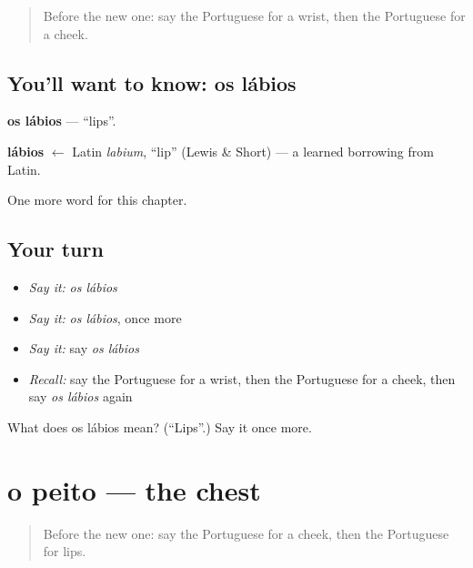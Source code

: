 \label{lesson:PT-C120-labios}



\begin{quote}
Before the new one: say the Portuguese for a wrist, then the Portuguese for a cheek.
\end{quote}

\subsection*{You'll want to know: os lábios}
\textbf{os lábios} — \textquotedblleft{}lips\textquotedblright{}.

\begin{cousinweb}
\textbf{lábios} $\leftarrow$ Latin \emph{labium}, \textquotedblleft{}lip\textquotedblright{} (Lewis \& Short) — a learned borrowing from Latin.
\end{cousinweb}

\begin{grammarlens}[title={What you've built}]
One more word for this chapter.
\end{grammarlens}

\subsection*{Your turn}
\begin{itemize}
\raggedright
  \item \emph{Say it:} \emph{os lábios}
  \item \emph{Say it:} \emph{os lábios}, once more
  \item \emph{Say it:} say \emph{os lábios}
  \item \emph{Recall:} say the Portuguese for a wrist, then the Portuguese for a cheek, then say \emph{os lábios} again
\end{itemize}

\begin{tcolorbox}[breakable,colback=teal!4,colframe=teal!35!black,title={Before you move on}]
What does os lábios mean? (\textquotedblleft{}Lips\textquotedblright{}.) Say it once more.
\end{tcolorbox}
\section[o peito]{o peito — the chest}

\label{lesson:PT-C120-peito}



\begin{quote}
Before the new one: say the Portuguese for a cheek, then the Portuguese for lips.
\end{quote}

